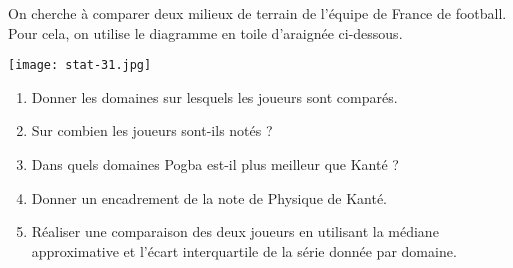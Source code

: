 
On cherche à comparer deux milieux de terrain de l'équipe de France de football. Pour cela, on utilise le diagramme en toile d'araignée ci-dessous.

\begin{center}
\texttt{[image: stat-31.jpg]}
\end{center}


\begin{enumerate}
\item Donner les domaines sur lesquels les joueurs sont comparés.
\item Sur combien les joueurs sont-ils notés ?
\item Dans quels domaines Pogba est-il plus meilleur que Kanté ?
\item Donner un encadrement de la note de Physique de Kanté.
\item Réaliser une comparaison des deux joueurs en utilisant la médiane approximative et l'écart interquartile de la série donnée par domaine.
\end{enumerate} 